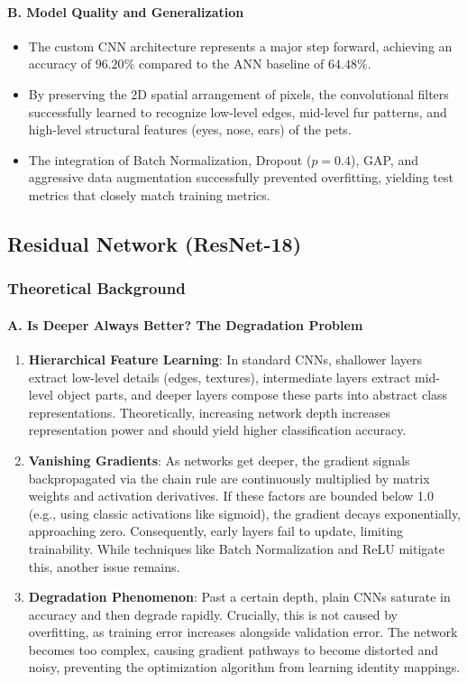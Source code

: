 \documentclass[12pt,a4paper]{article}
\begin{document}
\paragraph{B. Model Quality and Generalization}
\begin{itemize}
    \item The custom CNN architecture represents a major step forward, achieving an accuracy of \textbf{$96.20\%$} compared to the ANN baseline of $64.48\%$.
    \item By preserving the 2D spatial arrangement of pixels, the convolutional filters successfully learned to recognize low-level edges, mid-level fur patterns, and high-level structural features (eyes, nose, ears) of the pets.
    \item The integration of Batch Normalization, Dropout ($p=0.4$), GAP, and aggressive data augmentation successfully prevented overfitting, yielding test metrics that closely match training metrics.
\end{itemize}

\subsection{Residual Network (ResNet-18)}

\subsubsection{Theoretical Background}

\paragraph{A. Is Deeper Always Better? The Degradation Problem}
\begin{enumerate}
    \item \textbf{Hierarchical Feature Learning}: In standard CNNs, shallower layers extract low-level details (edges, textures), intermediate layers extract mid-level object parts, and deeper layers compose these parts into abstract class representations. Theoretically, increasing network depth increases representation power and should yield higher classification accuracy.
    \item \textbf{Vanishing Gradients}: As networks get deeper, the gradient signals backpropagated via the chain rule are continuously multiplied by matrix weights and activation derivatives. If these factors are bounded below 1.0 (e.g., using classic activations like sigmoid), the gradient decays exponentially, approaching zero. Consequently, early layers fail to update, limiting trainability. While techniques like Batch Normalization and ReLU mitigate this, another issue remains.
    \item \textbf{Degradation Phenomenon}: Past a certain depth, plain CNNs saturate in accuracy and then degrade rapidly. Crucially, this is not caused by overfitting, as training error increases alongside validation error. The network becomes too complex, causing gradient pathways to become distorted and noisy, preventing the optimization algorithm from learning identity mappings.
\end{enumerate}
\end{document}
